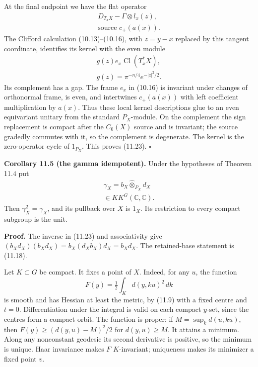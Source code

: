 \documentclass[
  11pt,
]{article}
\begin{document}
At the final endpoint we have the flat operator \[
\begin{gathered}
D_{T_xX}-\Gamma\otimes l_x(z),\\
\text{source }c_+(a(x)).
\end{gathered}
\tag{11.32}
\] The Clifford calculation (10.13)--(10.16), with \(z=y-x\) replaced by
this tangent coordinate, identifies its kernel with the even module \[
\begin{gathered}
g(z)e_x\operatorname{Cl}(T_x^*X),\\
g(z)=\pi^{-n/4}e^{-|z|^2/2}.
\end{gathered}
\tag{11.33}
\] Its complement has a gap. The frame \(e_x\) in (10.16) is invariant
under changes of orthonormal frame, is even, and intertwines
\(c_+(a(x))\) with left coefficient multiplication by \(a(x)\). Thus
these local kernel descriptions glue to an even equivariant unitary from
the standard \(P_X\)-module. On the complement the sign replacement is
compact after the \(C_0(X)\) source and is invariant; the source
gradedly commutes with it, so the complement is degenerate. The kernel
is the zero-operator cycle of \(1_{P_X}\). This proves (11.23).
\(\square\)

\textbf{Corollary 11.5 (the gamma idempotent).} Under the hypotheses of
Theorem 11.4 put \[
\begin{gathered}
\gamma_X=b_X\widehat\otimes_{P_X}d_X\\
\in KK^G(\mathbb C,\mathbb C).
\end{gathered}
\tag{11.34}
\] Then \(\gamma_X^2=\gamma_X\), and its pullback over \(X\) is \(1_X\).
Its restriction to every compact subgroup is the unit.

\textbf{Proof.} The inverse in (11.23) and associativity give
\((b_Xd_X)(b_Xd_X)=b_X(d_Xb_X)d_X=b_Xd_X\). The retained-base statement
is (11.18).

Let \(K\subset G\) be compact. It fixes a point of \(X\). Indeed, for
any \(u\), the function \[
F(y)=\tfrac12\int_K d(y,ku)^2\,dk
\tag{11.35}
\] is smooth and has Hessian at least the metric, by (11.9) with a fixed
centre and \(t=0\). Differentiation under the integral is valid on each
compact \(y\)-set, since the centres form a compact orbit. The function
is proper: if \(M=\sup_k d(u,ku)\), then \(F(y)\geq(d(y,u)-M)^2/2\) for
\(d(y,u)\geq M\). It attains a minimum. Along any nonconstant geodesic
its second derivative is positive, so the minimum is unique. Haar
invariance makes \(F\) \(K\)-invariant; uniqueness makes its minimizer a
fixed point \(v\).
\end{document}
